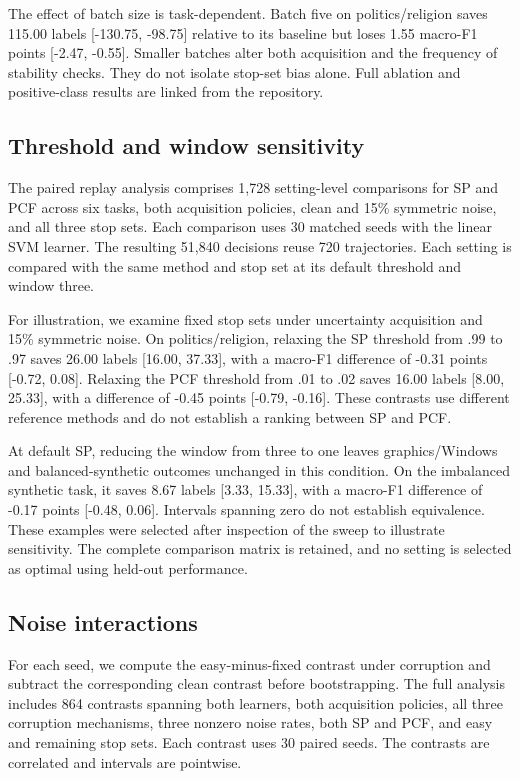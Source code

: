 \documentclass[10pt,twocolumn]{article}
\begin{document}
The effect of batch size is task-dependent. Batch five on politics/religion saves 115.00 labels [-130.75, -98.75] relative to its baseline but loses 1.55 macro-F1 points [-2.47, -0.55]. Smaller batches alter both acquisition and the frequency of stability checks. They do not isolate stop-set bias alone. Full ablation and positive-class results are linked from the repository.

\subsection{Threshold and window sensitivity}
The paired replay analysis comprises 1,728 setting-level comparisons for SP and PCF across six tasks, both acquisition policies, clean and 15\% symmetric noise, and all three stop sets. Each comparison uses 30 matched seeds with the linear SVM learner. The resulting 51,840 decisions reuse 720 trajectories. Each setting is compared with the same method and stop set at its default threshold and window three.

For illustration, we examine fixed stop sets under uncertainty acquisition and 15\% symmetric noise. On politics/religion, relaxing the SP threshold from .99 to .97 saves 26.00 labels [16.00, 37.33], with a macro-F1 difference of -0.31 points [-0.72, 0.08]. Relaxing the PCF threshold from .01 to .02 saves 16.00 labels [8.00, 25.33], with a difference of -0.45 points [-0.79, -0.16]. These contrasts use different reference methods and do not establish a ranking between SP and PCF.

At default SP, reducing the window from three to one leaves graphics/Windows and balanced-synthetic outcomes unchanged in this condition. On the imbalanced synthetic task, it saves 8.67 labels [3.33, 15.33], with a macro-F1 difference of -0.17 points [-0.48, 0.06]. Intervals spanning zero do not establish equivalence. These examples were selected after inspection of the sweep to illustrate sensitivity. The complete comparison matrix is retained, and no setting is selected as optimal using held-out performance.

\subsection{Noise interactions}
For each seed, we compute the easy-minus-fixed contrast under corruption and subtract the corresponding clean contrast before bootstrapping. The full analysis includes 864 contrasts spanning both learners, both acquisition policies, all three corruption mechanisms, three nonzero noise rates, both SP and PCF, and easy and remaining stop sets. Each contrast uses 30 paired seeds. The contrasts are correlated and intervals are pointwise.
\end{document}
